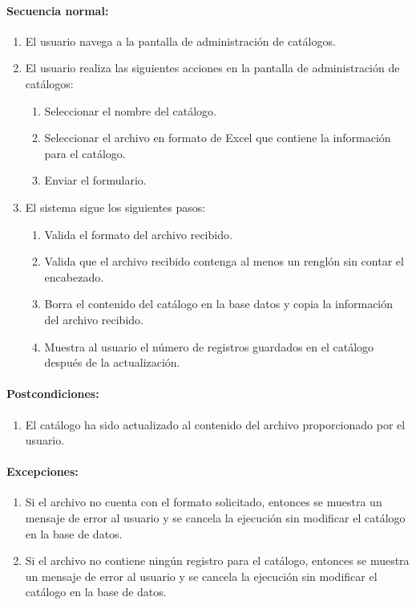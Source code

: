 \paragraph{Secuencia normal:}
\begin{enumerate}
  \item El usuario navega a la pantalla de administración de catálogos.
  \item El usuario realiza las siguientes acciones en la pantalla de administración de catálogos:
  \begin{enumerate}
    \item Seleccionar el nombre del catálogo.
    \item Seleccionar el archivo en formato de Excel\textsuperscript{\textcopyright} que contiene la información para el catálogo.
    \item Enviar el formulario.
  \end{enumerate}
  \item El sistema sigue los siguientes pasos:
  \begin{enumerate}
    \item Valida el formato del archivo recibido.
    \item Valida que el archivo recibido contenga al menos un renglón sin contar el encabezado.
    \item Borra el contenido del catálogo en la base datos y copia la información del archivo recibido.
    \item Muestra al usuario el número de registros guardados en el catálogo después de la actualización.
  \end{enumerate}
\end{enumerate}
\paragraph{Postcondiciones:}
\begin{enumerate}
  \item El catálogo ha sido actualizado al contenido del archivo proporcionado por el usuario.
\end{enumerate}
\paragraph{Excepciones:}
\begin{enumerate}
  \item Si el archivo no cuenta con el formato solicitado, entonces se muestra un mensaje de error al usuario y se cancela la ejecución sin modificar el catálogo en la base de datos.
  \item Si el archivo no contiene ningún registro para el catálogo, entonces se muestra un mensaje de error al usuario y se cancela la ejecución sin modificar el catálogo en la base de datos.
\end{enumerate}


